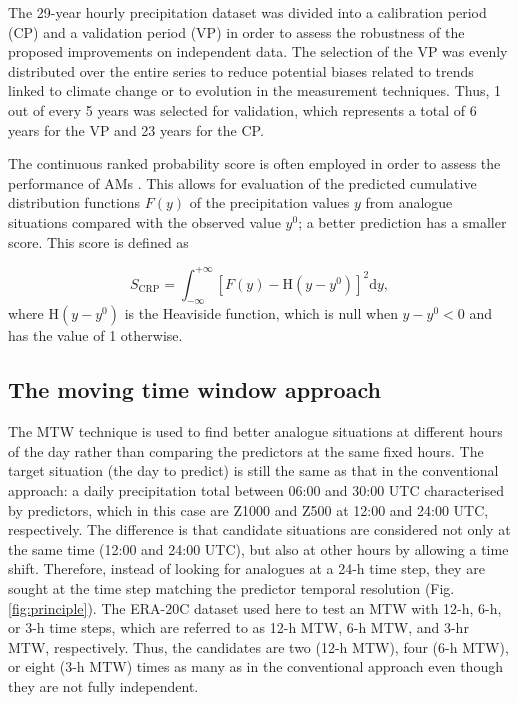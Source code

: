 \documentclass[hess, manuscript]{copernicus}
\begin{document}
	The 29-year hourly precipitation dataset was divided into a calibration period (CP) and a validation period (VP) in order to assess the robustness of the proposed improvements on independent data. The selection of the VP was evenly distributed over the entire series \citep{BenDaoud2010} to reduce potential biases related to trends linked to climate change or to evolution in the measurement techniques. Thus, 1 out of every 5 years was selected for validation, which represents a total of 6 years for the VP and 23 years for the CP.
	
	The continuous ranked probability score \citep[CRPS,][]{Brown1974, Matheson1976, Hersbach2000} is often employed in order to assess the performance of AMs \citep[e.g.][]{Bontron2004, Bontron2005, BenDaoud2008, Horton2012, Marty2012, Radanovics2013, Chardon2014, Junk2015, BenDaoud2016, Caillouet2016}. This allows for evaluation of the predicted cumulative distribution functions $F(y)$ of the precipitation values $y$ from analogue situations compared with the observed value $y^{0}$; a better prediction has a smaller score. This score is defined as 
	
	\begin{equation}
	\label{eq:CRPS}
	S_{\text{CRP}} = \int_{-\infty}^{+\infty} \left[ F(y)-\text{H}(y-y^{0})\right]^{2} \text{d}y ,  
	\end{equation}
	where $\text{H}(y-y^{0})$ is the Heaviside function, which is null when $y-y^{0}<0$ and has the value of 1 otherwise.
	
	
	\subsection{The moving time window approach}
	\label{sec:mtw}
	
	The MTW technique is used to find better analogue situations at different hours of the day rather than comparing the predictors at the same fixed hours. The target situation (the day to predict) is still the same as that in the conventional approach: a daily precipitation total between 06:00 and 30:00 UTC characterised by predictors, which in this case are Z1000 and Z500 at 12:00 and 24:00 UTC, respectively. The difference is that candidate situations are considered not only at the same time (12:00 and 24:00 UTC), but also at other hours by allowing a time shift. Therefore, instead of looking for analogues at a 24-h time step, they are sought at the time step matching the predictor temporal resolution (Fig. \ref{fig:principle}). The ERA-20C dataset used here to test an MTW with 12-h, 6-h, or 3-h time steps, which are referred to as 12-h MTW, 6-h MTW, and 3-hr MTW, respectively. Thus, the candidates are two (12-h MTW), four (6-h MTW), or eight (3-h MTW) times as many  as in the conventional approach even though they are not fully independent.
	
\end{document}
